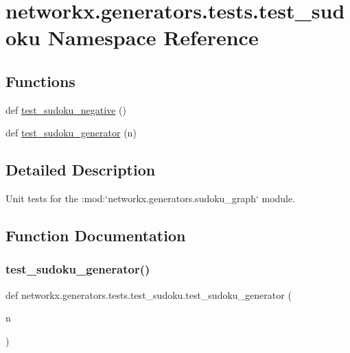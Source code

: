 \hypertarget{namespacenetworkx_1_1generators_1_1tests_1_1test__sudoku}{}\section{networkx.\+generators.\+tests.\+test\+\_\+sudoku Namespace Reference}
\label{namespacenetworkx_1_1generators_1_1tests_1_1test__sudoku}
\subsection*{Functions}
\begin{DoxyCompactItemize}
\item 
def \hyperlink{namespacenetworkx_1_1generators_1_1tests_1_1test__sudoku_a82d6b056c8b9f894ae9263c5a8a8b66b}{test\+\_\+sudoku\+\_\+negative} ()
\item 
def \hyperlink{namespacenetworkx_1_1generators_1_1tests_1_1test__sudoku_a6502319a7fbe5bc69067c254e5ebb9d1}{test\+\_\+sudoku\+\_\+generator} (n)
\end{DoxyCompactItemize}


\subsection{Detailed Description}
\begin{DoxyVerb}Unit tests for the :mod:`networkx.generators.sudoku_graph` module.\end{DoxyVerb}
 

\subsection{Function Documentation}
\mbox{\label{namespacenetworkx_1_1generators_1_1tests_1_1test__sudoku_a6502319a7fbe5bc69067c254e5ebb9d1}} 
\subsubsection{\texorpdfstring{test\+\_\+sudoku\+\_\+generator()}{test\_sudoku\_generator()}}
{\footnotesize\ttfamily def networkx.\+generators.\+tests.\+test\+\_\+sudoku.\+test\+\_\+sudoku\+\_\+generator (\begin{DoxyParamCaption}\item[{}]{n }\end{DoxyParamCaption})}


